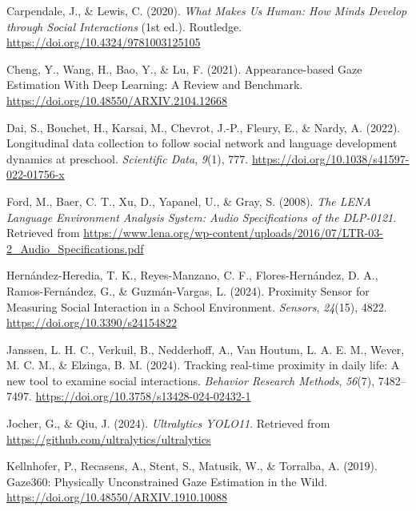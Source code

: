 \documentclass[
  man,floatsintext]{apa6}
\newlength{\cslhangindent}
\newenvironment{CSLReferences}[2] %
 {\begin{list}{}{%
  \setlength{\itemindent}{0pt}
  \setlength{\leftmargin}{0pt}
  \setlength{\parsep}{0pt}
  \ifodd #1
   \setlength{\leftmargin}{\cslhangindent}
   \setlength{\itemindent}{-1\cslhangindent}
  \fi
  \setlength{\itemsep}{#2\baselineskip}}}
 {\end{list}}
\begin{document}
\label{refs}
\begin{CSLReferences}{1}{0}
Carpendale, J., \& Lewis, C. (2020). \emph{What {Makes Us Human}: {How Minds Develop} through {Social Interactions}} (1st ed.). Routledge. \url{https://doi.org/10.4324/9781003125105}

Cheng, Y., Wang, H., Bao, Y., \& Lu, F. (2021). Appearance-based {Gaze Estimation With Deep Learning}: {A Review} and {Benchmark}. \url{https://doi.org/10.48550/ARXIV.2104.12668}

Dai, S., Bouchet, H., Karsai, M., Chevrot, J.-P., Fleury, E., \& Nardy, A. (2022). Longitudinal data collection to follow social network and language development dynamics at preschool. \emph{Scientific Data}, \emph{9}(1), 777. \url{https://doi.org/10.1038/s41597-022-01756-x}

Ford, M., Baer, C. T., Xu, D., Yapanel, U., \& Gray, S. (2008). \emph{The {LENA Language Environment Analysis System}: {Audio Specifications} of the {DLP-0121}}. Retrieved from \url{https://www.lena.org/wp-content/uploads/2016/07/LTR-03-2_Audio_Specifications.pdf}

Hernández-Heredia, T. K., Reyes-Manzano, C. F., Flores-Hernández, D. A., Ramos-Fernández, G., \& Guzmán-Vargas, L. (2024). Proximity {Sensor} for {Measuring Social Interaction} in a {School Environment}. \emph{Sensors}, \emph{24}(15), 4822. \url{https://doi.org/10.3390/s24154822}

Janssen, L. H. C., Verkuil, B., Nedderhoff, A., Van Houtum, L. A. E. M., Wever, M. C. M., \& Elzinga, B. M. (2024). Tracking real-time proximity in daily life: {A} new tool to examine social interactions. \emph{Behavior Research Methods}, \emph{56}(7), 7482--7497. \url{https://doi.org/10.3758/s13428-024-02432-1}

Jocher, G., \& Qiu, J. (2024). \emph{Ultralytics {YOLO11}}. Retrieved from \url{https://github.com/ultralytics/ultralytics}

Kellnhofer, P., Recasens, A., Stent, S., Matusik, W., \& Torralba, A. (2019). Gaze360: {Physically Unconstrained Gaze Estimation} in the {Wild}. \url{https://doi.org/10.48550/ARXIV.1910.10088}


\end{CSLReferences}
\end{document}
